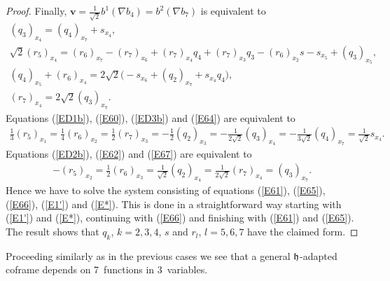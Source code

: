 \documentclass[pdftex]{sigma}
\numberwithin{equation}{section}
\newcommand\fh{{\frak h}}
\newcommand\bv{{\mathbf v}}
\begin{document}
\begin{proof}
Finally, $\bv=\frac1{\sqrt2} b^1(\nabla b_4)=b^2(\nabla b_7)$ is equivalent to
\begin{gather}
 (q_3)_{x_4}=(q_4)_{x_7}+s_{x_4}, \label{E64}\\
 \sqrt2(r_5)_{x_4}=(r_6)_{x_7} -(r_7)_{x_6}+(r_7)_{x_4}q_4+(r_7)_{x_3}q_3-(r_6)_{x_2}s - s_{x_5}+(q_3)_{x_5},\label{E65}\\
 (q_4)_{x_5}+(r_6)_{x_4} = 2\sqrt2 \big({-}s_{x_6}+ (q_2)_{x_7} +s_{x_4}q_4\big), \label{E66} \\
 (r_7)_{x_4} = 2\sqrt2 (q_3)_{x_7} . \label{E67}
\end{gather}
Equations (\ref{ED1b}), (\ref{E60}), (\ref{ED3b}) and (\ref{E64}) are equivalent to
\begin{gather}\label{E1'}
\tfrac13 (r_5)_{x_1} = \tfrac14 (r_6)_{x_2}=\tfrac12 (r_7)_{x_3} =-\tfrac12 (q_2)_{x_3}=-\tfrac 1{2\sqrt 2} (q_3)_{x_4}=-\tfrac1{3\sqrt2} (q_4)_{x_7}=\tfrac 1{\sqrt2} s_{x_4}.
\end{gather}
Equations (\ref{ED2b}), (\ref{E62}) and (\ref{E67}) are equivalent to
\begin{gather}\label{E*}
-(r_5)_{x_2}=\tfrac12 (r_6)_{x_3}=\tfrac1{\sqrt 2}(q_2)_{x_4}=\tfrac1 {2\sqrt2}(r_7)_{x_4} =(q_3)_{x_7} .
\end{gather}
Hence we have to solve the system consisting of equations (\ref{E61}), (\ref{E65}), (\ref{E66}), (\ref{E1'}) and (\ref{E*}). This is done in a straightforward way starting with (\ref{E1'}) and (\ref{E*}), continuing with (\ref{E66}) and finishing with (\ref{E61}) and (\ref{E65}).
The result shows that $q_k$, $k=2,3,4$, $s$ and $r_l$, $l=5,6,7$ have the claimed form. \end{proof}

\begin{Remark} Proceeding similarly as in the previous cases we see that a general $\fh$-adapted coframe depends on 7~functions in 3~variables.
\end{Remark}
\end{document}

